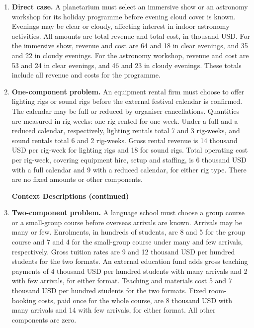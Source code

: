 	\begin{enumerate}[leftmargin=0.22in]
\item \textbf{Direct case.} A planetarium must select an immersive show or an astronomy workshop for its holiday programme before evening cloud cover is known. Evenings may be clear or cloudy, affecting interest in indoor astronomy activities. All amounts are total revenue and total cost, in thousand USD. For the immersive show, revenue and cost are 64 and 18 in clear evenings, and 35 and 22 in cloudy evenings. For the astronomy workshop, revenue and cost are 53 and 24 in clear evenings, and 46 and 23 in cloudy evenings. These totals include all revenue and costs for the programme.

\item \textbf{One-component problem.} An equipment rental firm must choose to offer lighting rigs or sound rigs before the external festival calendar is confirmed. The calendar may be full or reduced by organiser cancellations. Quantities are measured in rig-weeks: one rig rented for one week. Under a full and a reduced calendar, respectively, lighting rentals total 7 and 3 rig-weeks, and sound rentals total 6 and 2 rig-weeks. Gross rental revenue is 14 thousand USD per rig-week for lighting rigs and 18 for sound rigs. Total operating cost per rig-week, covering equipment hire, setup and staffing, is 6 thousand USD with a full calendar and 9 with a reduced calendar, for either rig type. There are no fixed amounts or other components.

\noindent\textbf{Context Descriptions (continued)}
\item \textbf{Two-component problem.} A language school must choose a group course or a small-group course before overseas arrivals are known. Arrivals may be many or few. Enrolments, in hundreds of students, are 8 and 5 for the group course and 7 and 4 for the small-group course under many and few arrivals, respectively. Gross tuition rates are 9 and 12 thousand USD per hundred students for the two formats. An external education fund adds gross teaching payments of 4 thousand USD per hundred students with many arrivals and 2 with few arrivals, for either format. Teaching and materials cost 5 and 7 thousand USD per hundred students for the two formats. Fixed room-booking costs, paid once for the whole course, are 8 thousand USD with many arrivals and 14 with few arrivals, for either format. All other components are zero.


\end{enumerate}
